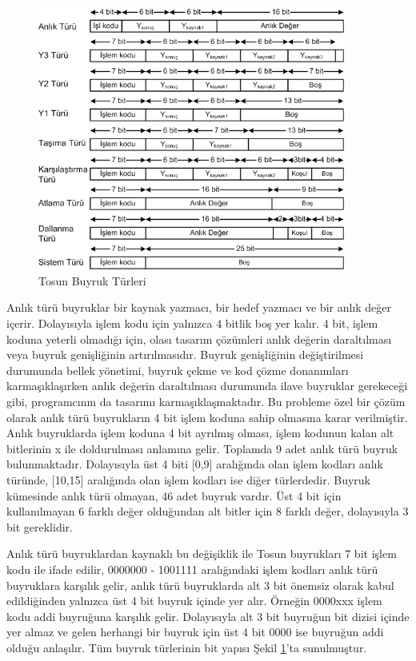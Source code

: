 \begin{figure}[ht]
\centering
\shorthandoff{=}
\includegraphics[width=0.9\textwidth]{gorsel/instructionTypes.png}
\shorthandoff{=}
\caption{Tosun Buyruk Türleri}
\label{image:instructionTypes}
\end{figure}

Anlık türü buyruklar bir kaynak yazmacı, bir hedef yazmacı ve bir anlık değer içerir. Dolayısıyla işlem kodu için yalnızca 4 bitlik boş yer kalır. 4 bit, işlem koduna yeterli olmadığı için, olası tasarım çözümleri anlık değerin daraltılması veya buyruk genişliğinin artırılmasıdır. Buyruk genişliğinin değiştirilmesi durumunda bellek yönetimi, buyruk çekme ve kod çözme donanımları karmaşıklaşırken anlık değerin daraltılması durumunda ilave buyruklar gerekeceği gibi, programcının da tasarımı karmaşıklaşmaktadır. Bu probleme özel bir çözüm olarak anlık türü buyrukların 4 bit işlem koduna sahip olmasına karar verilmiştir. Anlık buyruklarda işlem koduna 4 bit ayrılmış olması, işlem kodunun kalan alt bitlerinin x ile doldurulması anlamına gelir. Toplamda 9 adet anlık türü buyruk bulunmaktadır. Dolayısıyla üst 4 biti [0,9] aralığında olan işlem kodları anlık türünde, [10,15] aralığında olan işlem kodları ise diğer türlerdedir. Buyruk kümesinde anlık türü olmayan, 46 adet buyruk vardır. Üst 4 bit için kullanılmayan 6 farklı değer olduğundan alt bitler için 8 farklı değer, dolayısıyla 3 bit gereklidir. \par

Anlık türü buyruklardan kaynaklı bu değişiklik ile Tosun buyrukları 7 bit işlem kodu ile ifade edilir, 0000000 - 1001111 aralığındaki işlem kodları anlık türü buyruklara karşılık gelir, anlık türü buyruklarda alt 3 bit önemsiz olarak kabul edildiğinden yalnızca üst 4 bit buyruk içinde yer alır. Örneğin 0000xxx işlem kodu addi buyruğuna karşılık gelir. Dolayısıyla alt 3 bit buyruğun bit dizisi içinde yer almaz ve gelen herhangi bir buyruk için üst 4 bit 0000 ise buyruğun addi olduğu anlaşılır. Tüm buyruk türlerinin bit yapısı Şekil \ref{image:instructionTypes}'ta sunulmuştur. \par




